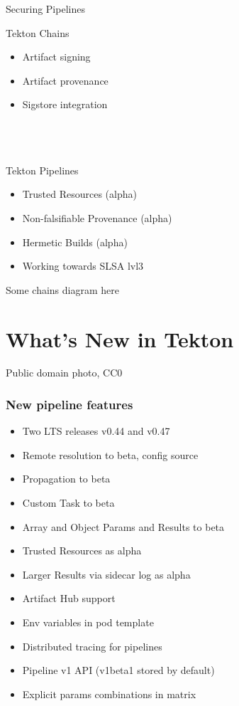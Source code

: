 \documentclass[aspectratio=169,11pt,hyperref={colorlinks=true}]{beamer}
\begin{document}
\begin{2columnsframe}{Securing Pipelines}%
  {%
  Tekton Chains
  \begin{itemize}
    \item Artifact signing
    \item Artifact provenance
    \item Sigstore integration
  \end{itemize}
  ~\\
  ~\\
  ~\\
  Tekton Pipelines
  \begin{itemize}
    \item Trusted Resources (alpha)
    \item Non-falsifiable Provenance (alpha)
    \item Hermetic Builds (alpha)
    \item Working towards SLSA lvl3
  \end{itemize}
  }{%
  Some chains diagram here
  }
\end{2columnsframe}

\section[What's New]{What's New in Tekton}
\begin{sectionwithpic}{Public domain photo, CC0}
\end{sectionwithpic}

\begin{blackframe}
  \frametitle{New pipeline features}
  \begin{itemize}
    \item Two LTS releases v0.44 and v0.47
    \item Remote resolution to beta, config source
    \item Propagation to beta
    \item Custom Task to beta
    \item Array and Object Params and Results to beta
    \item Trusted Resources as alpha
    \item Larger Results via sidecar log as alpha
    \item Artifact Hub support
    \item Env variables in pod template
    \item Distributed tracing for pipelines
    \item Pipeline v1 API (v1beta1 stored by default)
    \item Explicit params combinations in matrix
  \end{itemize}
\end{blackframe}
\end{document}
